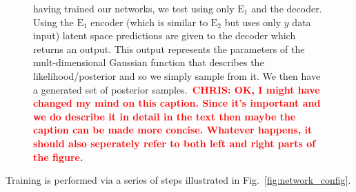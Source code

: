 \documentclass[%
showpacs,
 amsmath,amssymb,
 aps,
 twocolumn,
 prl,
 reprint,
floatfix,
]{revtex4-1}
\newcommand{\chris}[1]{\textbf{\textcolor{red}{CHRIS: #1}}}
\begin{document}
\begin{figure}
{having trained our networks, we test using only $\textrm{E}_1$ and the decoder.
Using the $\textrm{E}_1$ encoder (which is similar to $\textrm{E}_2$ but uses
only $y$ data input) latent space predictions are given to the decoder which
returns an output. This output represents the parameters of the
mult-dimensional Gaussian function that describes the likelihood/posterior and
so we simply sample from it. We then have a generated set of posterior
samples.~\chris{OK, I might have changed my mind on this caption. Since it's
important and we do describe it in detail in the text then maybe the caption
can be made more concise. Whatever happens, it should also seperately refer to
both left and right parts of the figure.}} 
\end{figure}

%
%
Training is performed via a series of steps illustrated in
Fig.~\ref{fig:network_config}. 
%
\end{document}
